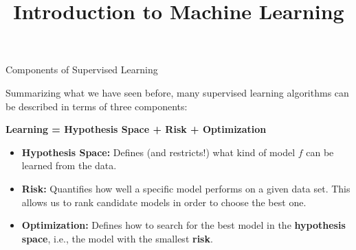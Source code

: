 \documentclass[11pt,compress,t,notes=noshow, xcolor=table]{beamer}
\title{Introduction to Machine Learning}
\institute{\href{https://compstat-lmu.github.io/lecture_i2ml/}{compstat-lmu.github.io/lecture\_i2ml}}
\date{}
\begin{document}









\begin{vbframe}{Components of Supervised Learning}

Summarizing what we have seen before, many supervised learning algorithms 
can be described in terms of three components:

\lz

\begin{center}

  \textbf{Learning = Hypothesis Space + Risk + Optimization}
  
\end{center}

\lz

\begin{itemize}

  \item \textbf{Hypothesis Space:} Defines (and restricts!) what kind of model 
  $f$ can be learned from the data.
  
  \item \textbf{Risk:} Quantifies how well a specific model performs on a given 
  data set. This allows us to rank candidate models in order to choose the best one.
  
  \item \textbf{Optimization:} Defines how to search for the best model in the 
  \textbf{hypothesis space}, i.e., the model with the smallest \textbf{risk}.
  
\end{itemize}

\end{vbframe}

\end{document}

